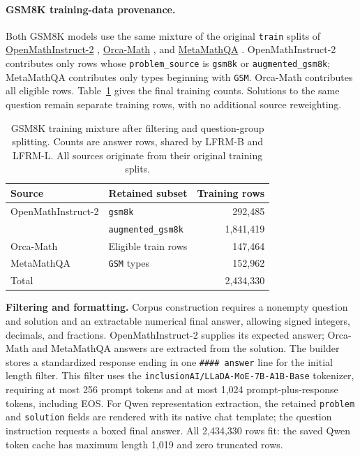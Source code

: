 \documentclass{article}
\begin{document}
\paragraph{GSM8K training-data provenance.}
Both GSM8K models use the same mixture of the original \texttt{train} splits of \href{https://huggingface.co/datasets/nvidia/OpenMathInstruct-2}{OpenMathInstruct-2} \citep{openmath}, \href{https://huggingface.co/datasets/microsoft/orca-math-word-problems-200k}{Orca-Math} \citep{orcamath}, and \href{https://huggingface.co/datasets/meta-math/MetaMathQA}{MetaMathQA} \citep{metamath}. OpenMathInstruct-2 contributes only rows whose \texttt{problem\_source} is \texttt{gsm8k} or \texttt{augmented\_gsm8k}; MetaMathQA contributes only types beginning with \texttt{GSM}. Orca-Math contributes all eligible rows. Table~\ref{tab:gsmtrainingmixture} gives the final training counts. Solutions to the same question remain separate training rows, with no additional source reweighting.

\begin{table}[!htb]
\centering\small
\setlength{\tabcolsep}{6pt}
\caption{GSM8K training mixture after filtering and question-group splitting. Counts are answer rows, shared by LFRM-B and LFRM-L. All sources originate from their original training splits.}
\label{tab:gsmtrainingmixture}
\begin{tabular}{@{}llr@{}}
\toprule
Source & Retained subset & Training rows\\
\midrule
OpenMathInstruct-2 & \texttt{gsm8k} & 292,485\\
 & \texttt{augmented\_gsm8k} & 1,841,419\\
Orca-Math & Eligible train rows & 147,464\\
MetaMathQA & \texttt{GSM} types & 152,962\\
\midrule
Total & & 2,434,330\\
\bottomrule
\end{tabular}
\end{table}

\textbf{Filtering and formatting.} Corpus construction requires a nonempty question and solution and an extractable numerical final answer, allowing signed integers, decimals, and fractions. OpenMathInstruct-2 supplies its expected answer; Orca-Math and MetaMathQA answers are extracted from the solution. The builder stores a standardized response ending in one \texttt{\#\#\#\# answer} line for the initial length filter. This filter uses the \texttt{inclusionAI/LLaDA-MoE-7B-A1B-Base} tokenizer, requiring at most 256 prompt tokens and at most 1,024 prompt-plus-response tokens, including EOS. For Qwen representation extraction, the retained \texttt{problem} and \texttt{solution} fields are rendered with its native chat template; the question instruction requests a boxed final answer. All 2,434,330 rows fit: the saved Qwen token cache has maximum length 1,019 and zero truncated rows.
\end{document}
